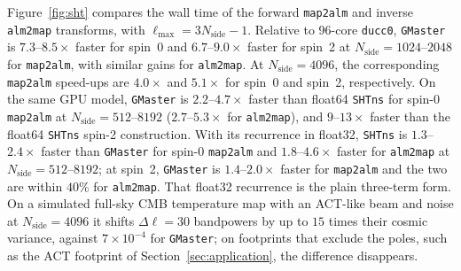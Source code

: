 \documentclass[letters,usenatbib,useAMS]{mnras}
\begin{document}
Figure~\ref{fig:sht} compares the wall time of the forward \texttt{map2alm} and inverse \texttt{alm2map} transforms, with $\ell_{\max}=3N_{\mathrm{side}}-1$. Relative to 96-core \texttt{ducc0}, \texttt{GMaster} is $7.3$--$8.5\times$ faster for spin~0 and $6.7$--$9.0\times$ faster for spin~2 at $N_{\mathrm{side}}=1024$--$2048$ for \texttt{map2alm}, with similar gains for \texttt{alm2map}. At $N_{\mathrm{side}}=4096$, the corresponding \texttt{map2alm} speed-ups are $4.0\times$ and $5.1\times$ for spin~0 and spin~2, respectively. On the same GPU model, \texttt{GMaster} is $2.2$--$4.7\times$ faster than float64 \texttt{SHTns} for spin-0 \texttt{map2alm} at $N_{\mathrm{side}}=512$--$8192$ ($2.7$--$5.3\times$ for \texttt{alm2map}), and $9$--$13\times$ faster than the float64 \texttt{SHTns} spin-2 construction. With its recurrence in float32, \texttt{SHTns} is $1.3$--$2.4\times$ faster than \texttt{GMaster} for spin-0 \texttt{map2alm} and $1.8$--$4.6\times$ faster for \texttt{alm2map} at $N_{\mathrm{side}}=512$--$8192$; at spin~2, \texttt{GMaster} is $1.4$--$2.0\times$ faster for \texttt{map2alm} and the two are within $40\%$ for \texttt{alm2map}. That float32 recurrence is the plain three-term form. On a simulated full-sky CMB temperature map with an ACT-like beam and noise at $N_{\mathrm{side}}=4096$ it shifts $\Delta\ell=30$ bandpowers by up to $15$ times their cosmic variance, against $7\times10^{-4}$ for \texttt{GMaster}; on footprints that exclude the poles, such as the ACT footprint of Section~\ref{sec:application}, the difference disappears.

\end{document}
